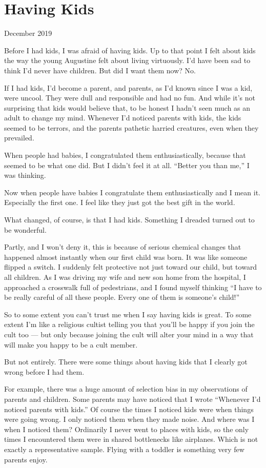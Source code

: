 \chapter{Having Kids}

December 2019

Before I had kids, I was afraid of having kids. Up to that point I felt
about kids the way the young Augustine felt about living virtuously. I'd
have been sad to think I'd never have children. But did I want them now?
No.~

If I had kids, I'd become a parent, and parents, as I'd known since I
was a kid, were uncool. They were dull and responsible and had no fun.
And while it's not surprising that kids would believe that, to be honest
I hadn't seen much as an adult to change my mind. Whenever I'd noticed
parents with kids, the kids seemed to be terrors, and the parents
pathetic harried creatures, even when they prevailed.

When people had babies, I congratulated them enthusiastically, because
that seemed to be what one did. But I didn't feel it at all. ``Better
you than me,'' I was thinking.

Now when people have babies I congratulate them enthusiastically and I
mean it. Especially the first one. I feel like they just got the best
gift in the world.

What changed, of course, is that I had kids. Something I dreaded turned
out to be wonderful.

Partly, and I won't deny it, this is because of serious chemical changes
that happened almost instantly when our first child was born. It was
like someone flipped a switch. I suddenly felt protective not just
toward our child, but toward all children. As I was driving my wife and
new son home from the hospital, I approached a crosswalk full of
pedestrians, and I found myself thinking ``I have to be really careful
of all these people. Every one of them is someone's child!''

So to some extent you can't trust me when I say having kids is great. To
some extent I'm like a religious cultist telling you that you'll be
happy if you join the cult too --- but only because joining the cult
will alter your mind in a way that will make you happy to be a cult
member.

But not entirely. There were some things about having kids that I
clearly got wrong before I had them.

For example, there was a huge amount of selection bias in my
observations of parents and children. Some parents may have noticed that
I wrote ``Whenever I'd noticed parents with kids.'' Of course the times
I noticed kids were when things were going wrong. I only noticed them
when they made noise. And where was I when I noticed them? Ordinarily I
never went to places with kids, so the only times I encountered them
were in shared bottlenecks like airplanes. Which is not exactly a
representative sample. Flying with a toddler is something very few
parents enjoy.

